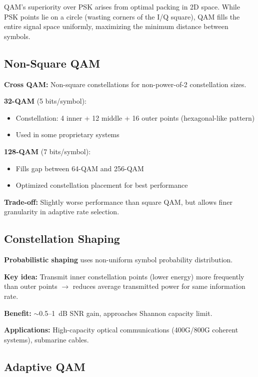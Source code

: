 \begin{keyconcept}
QAM's superiority over PSK arises from optimal packing in 2D space. While PSK points lie on a circle (wasting corners of the I/Q square), QAM fills the entire signal space uniformly, maximizing the minimum distance between symbols.
\end{keyconcept}

\subsection{Non-Square QAM}

\textbf{Cross QAM:} Non-square constellations for non-power-of-2 constellation sizes.

\textbf{32-QAM} (5 bits/symbol):
\begin{itemize}
\item Constellation: 4 inner + 12 middle + 16 outer points (hexagonal-like pattern)
\item Used in some proprietary systems
\end{itemize}

\textbf{128-QAM} (7 bits/symbol):
\begin{itemize}
\item Fills gap between 64-QAM and 256-QAM
\item Optimized constellation placement for best performance
\end{itemize}

\textbf{Trade-off:} Slightly worse performance than square QAM, but allows finer granularity in adaptive rate selection.

\subsection{Constellation Shaping}

\textbf{Probabilistic shaping} uses non-uniform symbol probability distribution.

\textbf{Key idea:} Transmit inner constellation points (lower energy) more frequently than outer points $\rightarrow$ reduces average transmitted power for same information rate.

\textbf{Benefit:} $\sim$0.5--1~dB SNR gain, approaches Shannon capacity limit.

\textbf{Applications:} High-capacity optical communications (400G/800G coherent systems), submarine cables.

\subsection{Adaptive QAM}

